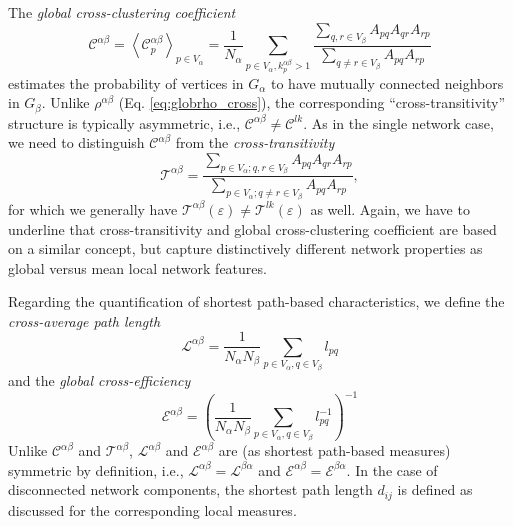		The \textit{global cross-clustering coefficient}
\begin{equation}
{\mathcal{C}}^{\alpha\beta} = \left<{\mathcal{C}}_p^{\alpha\beta}\right>_{p \in V_\alpha} = \frac{1}{N_\alpha} \sum_{p \in V_\alpha, {k}_p^{\alpha\beta}>1} \frac{\sum_{q,r \in V_\beta} A_{pq} A_{qr} A_{rp}}{\sum_{q \neq r \in V_\beta} A_{pq} A_{rp}}
\label{eq:globclustering_cross}
\end{equation}
estimates the probability of vertices in $G_\alpha$ to have mutually connected neighbors in $G_\beta$. Unlike $\rho^{\alpha\beta}$ (Eq. \eqref{eq:globrho_cross}), the corresponding ``cross-transitivity'' structure is typically asymmetric, i.e., ${\mathcal{C}}^{\alpha\beta} \neq {\mathcal{C}}^{lk}$. As in the single network case, we need to distinguish ${\mathcal{C}}^{\alpha\beta}$ from the \textit{cross-transitivity}
\begin{equation}
{\mathcal{T}}^{\alpha\beta} = \frac{\sum_{p \in V_\alpha; q,r \in V_\beta} A_{pq} A_{qr} A_{rp}}{\sum_{p \in V_\alpha; q \neq r \in V_\beta} A_{pq}  A_{rp}},
\label{eq:transitivity_cross}
\end{equation}
for which we generally have ${\mathcal{T}}^{\alpha\beta}(\varepsilon) \neq {\mathcal{T}}^{lk}(\varepsilon)$ as well. Again, we have to underline that cross-transitivity and global cross-clustering coefficient are based on a similar concept, but capture distinctively different network properties as global versus mean local network features.

		Regarding the quantification of shortest path-based characteristics, we define the \textit{cross-average path length}
\begin{equation}
{\mathcal{L}}^{\alpha\beta} = \frac{1}{N_\alpha N_\beta} \sum_{p \in V_\alpha, q \in V_\beta} l_{pq} 
\label{eq:apl_cross}
\end{equation}
and the \textit{global cross-efficiency}
\begin{equation}
{\mathcal{E}}^{\alpha\beta} = \left( \frac{1}{N_\alpha N_\beta} \sum_{p \in V_\alpha, q \in V_\beta} l_{pq}^{-1} \right)^{-1} 
\label{eq:globefficiency_cross}
\end{equation}
\noindent
Unlike ${\mathcal{C}}^{\alpha\beta}$ and ${\mathcal{T}}^{\alpha\beta}$, ${\mathcal{L}}^{\alpha\beta}$ and ${\mathcal{E}}^{\alpha\beta}$ are (as shortest path-based measures) symmetric by definition, i.e., ${\mathcal{L}}^{\alpha\beta}={\mathcal{L}}^{\beta\alpha}$ and ${\mathcal{E}}^{\alpha\beta}={\mathcal{E}}^{\beta\alpha}$. In the case of disconnected network components, the shortest path length $d_{ij}$ is defined as discussed for the corresponding local measures.

